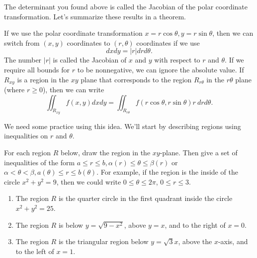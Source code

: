 The determinant you found above is called the Jacobian of the polar coordinate transformation.  Let's summarize these results in a theorem. 



\begin{theorem}%
 If we use the polar coordinate transformation $x=r\cos\theta, y=r\sin\theta$, then we can switch from $(x,y)$ coordinates to $(r,\theta)$ coordinates if we use $$dxdy=|r|drd\theta.$$  The number $|r|$ is called the Jacobian of $x$ and $y$ with respect to $r$ and $\theta$. If we require all bounds for $r$ to be nonnegative, we can ignore the absolute value.  If $R_{xy}$ is a region in the $xy$ plane that corresponds to the region $R_{r\theta}$ in the $r\theta$ plane (where $r\geq 0$), then we can write $$\iint_{R_{xy}} f(x,y) dxdy = \iint_{R_{r\theta}} f(r\cos\theta,r\sin\theta) r\ drd\theta.$$ 
\end{theorem}

We need some practice using this idea. We'll start by describing regions using inequalities on $r$ and $\theta$.  




\begin{problem}
For each region $R$ below, draw the region in the $xy$-plane. Then give a set of inequalities of the form $a\leq r\leq b, \alpha(r)\leq \theta \leq \beta(r)$ or $\alpha<\theta<\beta, a(\theta)\leq r\leq b(\theta)$. For example, if the region is the inside of the circle $x^2+y^2=9$, then we could write $0\leq \theta\leq 2\pi$, $0\leq r\leq 3$. 
\begin{enumerate}
 \item The region $R$ is the quarter circle in the first quadrant inside the circle $x^2+y^2=25$.
 \item The region $R$ is below $y=\sqrt{9-x^2}$, above $y=x$, and to the right of $x=0$.  
 \item The region $R$ is the triangular region below $y=\sqrt 3 x$, above the $x$-axis, and to the left of $x=1$. 
\end{enumerate}
\end{problem}


